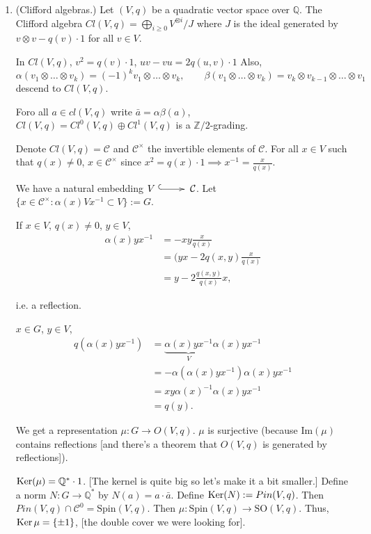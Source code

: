 \begin{enumerate}
\item (Clifford algebras.)
Let $(V,q)$ be a quadratic vector space over
$\mathbb{Q}$.
The Clifford algebra $Cl(V,q)=\bigoplus_{i
\geq 0}V^{\otimes i}/J$
where $J$ is the ideal generated by
$v \otimes v-q(v)\cdot 1$ for all $v \in V$.

In $Cl(V,q)$, $v^2=q(v)\cdot 1$,
$uv-vu=2q(u,v)\cdot 1$
Also,
$$
\alpha(v_1 \otimes … \otimes v_k)
=(-1)^k v_1 \otimes … \otimes v_k,\qquad
\beta(v_1 \otimes … \otimes v_k)
=v_k \otimes v_{k-1} \otimes … \otimes v_1
$$
descend to $Cl(V,q)$.

Foro all  $a \in cl(V,q)$ write
$\bar{a}=\alpha\beta(a)$,
$Cl(V,q)=Cl^0(V,q) \oplus Cl^1(V,q)$
is a $\mathbb{Z}/2$-grading.

Denote $Cl(V,q)=\mathcal{C}$ and
$\mathcal{C}^\times$
the invertible elements of $\mathcal{C}$.
For all $x \in V$ such that $q(x) \neq 0$,
$x \in \mathcal{C}^\times$ since
$x^2=q(x)\cdot 1 \implies
x^{-1}=\frac{x}{q(x)}$.

We have a natural embedding $V
\xymatrix{\ar@{^{(}->}[r]&} \mathcal{C}$.
Let $\{ x \in
\mathcal{C}^\times:\alpha(x)Vx^{-1}\subset
V\}:=G$.

If $x \in V$, $q(x) \neq 0$, $y \in V$,
$$
\begin{aligned}
\alpha(x) y x^{-1}&=-xy\frac{x}{q(x)}\\
&=(yx-2q(x,y)\frac{x}{q(x)}\\
&=y-2\frac{q(x,y)}{q(x)}x,
\end{aligned}
$$

\noindent
i.e. a reflection.

$x \in G$, $y \in V$,
$$
\begin{aligned}
q(\alpha(x)yx^{-1})&=\underbrace{\alpha(x)
yx^{-1}}_{V}\alpha(x)yx^{-1}\\
&=-\alpha(\alpha(x)yx^{-1})\alpha(x)yx^{-1}\\
&=xy\alpha(x)^{-1}\alpha(x)yx^{-1}\\
&=q(y).
\end{aligned}
$$

\noindent
We get a representation $\mu:G \to O(V,q)$.
$\mu$ is surjective (because $\text{Im}(\mu)$
contains reflections
[and there's a theorem that $O(V,q)$ is
generated by reflections]).

$\mathop{\mathrm{Ker}}(\mu)=\mathbb{Q}^*\cdot 1$.
[The kernel is quite big so let's make it a
bit smaller.]
Define a norm $N:G \to \mathbb{Q}^*$ by
$N(a)=a\cdot \bar{a}$.
Define $\mathop{\mathrm{Ker}}(N):=Pin(V,q)$.
Then $Pin(V,q) \cap
\mathcal{C}^0=\text{Spin}(V,q)$.
Then $\mu:\text{Spin}(V,q)\to
\text{SO}(V,q)$.
Thus, $\mathop{\mathrm{Ker}} \mu=\{\pm 1\}$,
[the double cover we were looking for].


\end{enumerate}
